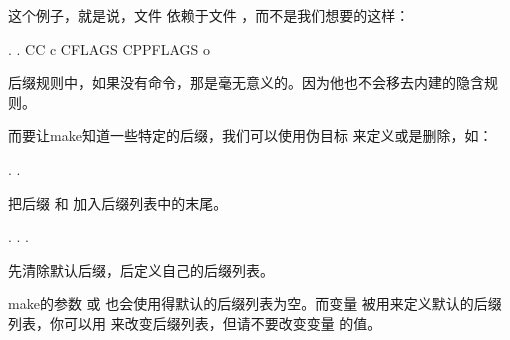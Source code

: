 \documentclass[a4paper,10pt]{sphinxmanual}
\begin{document}
这个例子，就是说，文件  依赖于文件  ，而不是我们想要的这样：

\begin{sphinxVerbatim}[commandchars=\\\{\}]
 \PYGZpc{}. .
    CC \PYGZhy{}c CFLAGS CPPFLAGS \PYGZhy{}o  \PYGZdl{}\PYGZlt{}
\end{sphinxVerbatim}

后缀规则中，如果没有命令，那是毫无意义的。因为他也不会移去内建的隐含规则。

而要让make知道一些特定的后缀，我们可以使用伪目标  来定义或是删除，如：

\begin{sphinxVerbatim}[commandchars=\\\{\}]
 . .
\end{sphinxVerbatim}

把后缀  和  加入后缀列表中的末尾。

\begin{sphinxVerbatim}[commandchars=\\\{\}]
              
 . . .   
\end{sphinxVerbatim}

先清除默认后缀，后定义自己的后缀列表。

make的参数  或  也会使用得默认的后缀列表为空。而变量
 被用来定义默认的后缀列表，你可以用  来改变后缀列表，但请不要改变变量  的值。
\end{document}
